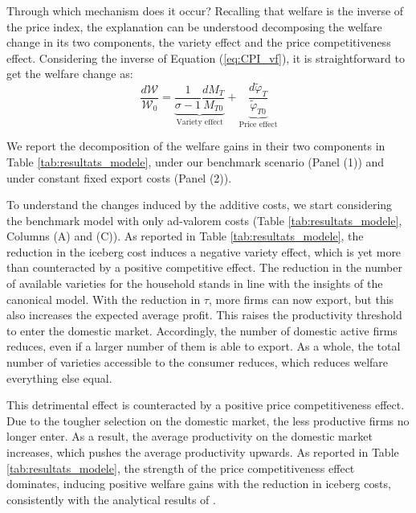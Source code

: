 \documentclass[a4paper,11pt]{article}
\begin{document}
Through which mechanism does it occur? Recalling that welfare is the inverse of the price index, the explanation can be understood decomposing the welfare change in its two components, the variety effect and the price competitiveness effect. Considering the inverse of Equation (\ref{eq:CPI_vf}), it is straightforward to get the welfare change as:
\begin{equation}
\frac{d\mathcal{W}}{\mathcal{W}_0} = \underbrace{\frac{1}{\sigma-1} \frac{d M_T}{M_{T0}}}_{\text{Variety effect}} +  \underbrace{\frac{d\widetilde{\varphi}_T}{\widetilde{\varphi}_{T0}}}_{\text{Price effect}} \label{eq:decompWelfare}
\end{equation}

We report the decomposition of the welfare gains in their two components in Table \ref{tab:resultats_modele}, under our benchmark scenario (Panel (1)) and under constant fixed export costs (Panel (2)).

To understand the changes induced by the additive costs, we start considering the benchmark model with only ad-valorem costs (Table \ref{tab:resultats_modele}, Columns (A) and (C)). As reported in Table \ref{tab:resultats_modele}, the reduction in the iceberg cost induces a negative variety effect, which is yet more than counteracted by a positive competitive effect. The reduction in the number of available varieties for the household stands in line with the insights of the canonical \cite{melitz} model. With the reduction in $\tau$, more firms can now export, but this also increases the expected average profit. This raises the productivity threshold to enter the domestic market. Accordingly, the number of domestic active firms reduces, even if a larger number of them is able to export. As a whole, the total number of varieties accessible to the consumer reduces, which reduces welfare everything else equal.

This detrimental effect is counteracted by a positive price competitiveness effect. Due to the tougher selection on the domestic market, the less productive firms no longer enter. As a result, the average productivity on the domestic market increases, which pushes the average productivity upwards. As reported in Table \ref{tab:resultats_modele}, the strength of the price competitiveness effect dominates, inducing positive welfare gains with the reduction in iceberg costs, consistently with the analytical results of \cite{melitz}.
\end{document}
